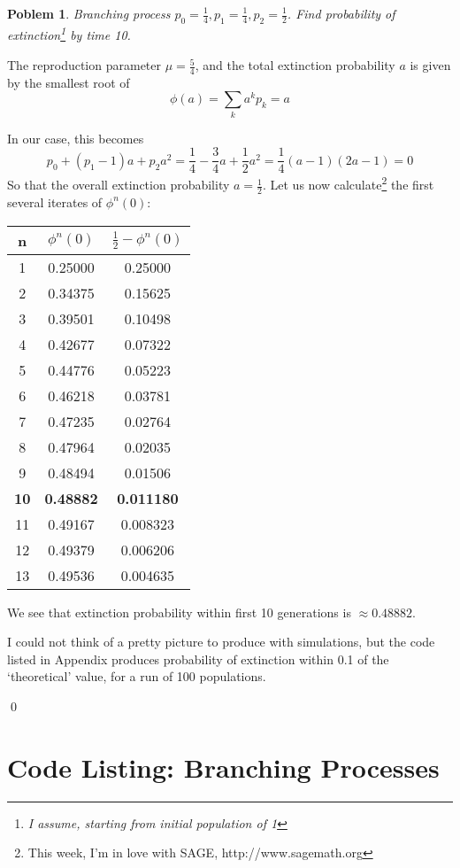 \documentclass[8pt,notitlepage]{report}
\newtheorem{problem}{Poblem}
\newenvironment{solution}[1][Solution]{\begin{trivlist}
    \item[\hskip \labelsep {\bfseries #1}]}{\end{trivlist}}
\newcommand{\PP}{\mathbb{P}}
\begin{document}
\begin{problem}
Branching process $p_0=\frac{1}{4}, p_1=\frac{1}{4}, p_2=\frac{1}{2}$. 
Find probability of extinction\footnote{
	I assume, starting from initial population of 1} by time 10.
\end{problem}
\begin{solution}


The reproduction parameter $\mu=\frac{5}{4}$, and 
the total extinction probability $a$ is given by the smallest root of
\begin{equation}
\phi(a) = \sum_k a^k p_k = a
\end{equation}

In our case, this becomes
\begin{equation}
p_0 + (p_1 - 1) a + p_2 a^2 
	= \frac{1}{4} - \frac{3}{4} a + \frac{1}{2} a^2
	= \frac{1}{4}(a-1)(2a-1)
	= 0
\end{equation}
So that the overall extinction probability $a=\frac{1}{2}$. 
Let us now calculate\footnote{
	This week, I'm in love with {\rm SAGE}, http://www.sagemath.org} 
the first several iterates of $\phi^n(0)$:

\begin{tabular}{ccc}
n & $\phi^n(0)$ & $\frac{1}{2} -\phi^n(0)$ \\
\hline
1 & 0.25000 & 0.25000 			\\
2 & 0.34375 & 0.15625			\\
3 & 0.39501 &0.10498		\\
4 & 0.42677 & 0.07322		\\
5 & 0.44776 & 0.05223		\\
6 & 0.46218 & 0.03781		\\
7 & 0.47235 & 0.02764		\\
8 & 0.47964 & 0.02035		\\
9 & 0.48494 & 0.01506		\\
{\bf 10}& {\bf 0.48882}&  {\bf 0.011180}	\\
11 & 0.49167 & 0.008323	\\
12 & 0.49379 & 0.006206	\\
13 & 0.49536 & 0.004635	\\
\end{tabular}

We see that extinction probability within first 10 generations is 
$\approx 0.48882$.

I could not think of a pretty picture to produce with simulations, 
but the code listed in Appendix produces probability of extinction 
within 0.1 of the `theoretical' value, for a run of 100 populations.




\qed
\end{solution}
\newpage
\appendix
\section*{Code Listing: Branching Processes}

\end{document}
